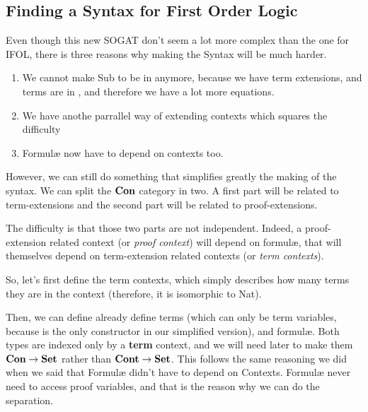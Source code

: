 \documentclass[10pt,a4paper]{article}
\begin{document}
		\subsection{Finding a Syntax for First Order Logic}
		
			Even though this new SOGAT don't seem a lot more complex than the one for IFOL, there is three reasons why making the Syntax will be much harder.
			
			\begin{enumerate}
				\item We cannot make Sub to be in  anymore, because we have term extensions, and terms are in , and therefore we have a lot more equations.
				\item We have anothe parrallel way of extending contexts which squares the difficulty
				\item Formulæ now have to depend on contexts too.
			\end{enumerate}
		
			However, we can still do something that simplifies greatly the making of the syntax. We can split the $\textbf{Con}$ category in two. A first part will be related to term-extensions and the second part will be related to proof-extensions.
			
			The difficulty is that those two parts are not independent. Indeed, a proof-extension related context (or \emph{proof context}) will depend on formulæ, that will themselves depend on term-extension related contexts (or \emph{term contexts}).
		
			So, let's first define the term contexts, which simply describes how many terms they are in the context (therefore, it is isomorphic to Nat).
			
			\begin{tcolorbox}
			\end{tcolorbox}
		
			Then, we can define already define terms (which can only be term variables, because  is the only constructor in our simplified version), and formulæ. Both types are indexed only by a \textbf{term} context, and we will need later to make them $\textbf{Con} \rightarrow \textbf{Set}$ rather than $\textbf{Cont} \rightarrow \textbf{Set}$. This follows the same reasoning we did when we said that Formulæ didn't have to depend on Contexts. Formulæ never need to access proof variables, and that is the reason why we can do the separation.
			
			\begin{tcolorbox}
				\agda{agda/FFOL-I-3.tex}
				\agdasep
				\agda{agda/FFOL-I-4.tex}
			\end{tcolorbox}
		
\end{document}

